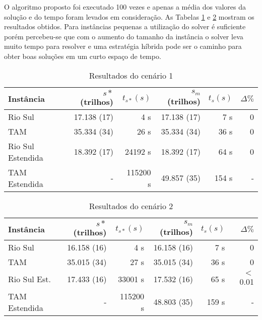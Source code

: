 O algoritmo proposto foi executado 100 vezes e apenas a média dos valores da
solução e do tempo foram levados em consideração. As Tabelas \ref{tab:cenario1}
e \ref{tab:cenario2} mostram os resultados obtidos. Para instâncias pequenas a
utilização do solver é suficiente porém percebeu-se que com o aumento do tamanho
da instância o solver leva muito tempo para resolver e uma estratégia híbrida
pode ser o caminho para obter boas soluções em um curto espaço de tempo.

\begin{table}[ht]
\caption{Resultados do cenário 1}\label{tab:cenario1}


\begin{tabular}{l r r r r r}
\hline

Instância 			& $s*$ (trilhos) & $t_{s*}(s)$ & $s_{m}$ (trilhos) & $t_{s}(s)$ &
$\Delta\%$
\\
\hline

Rio Sul 			& 17.138 (17) & 4 s		 	& 17.138 (17) 	& 7 s 		 & 0\\
TAM     			& 35.334 (34) & 26 s	 	& 35.334 (34)	& 36 s 		 & 0\\
Rio Sul Estendida 	& 18.392 (17) & 24192 s	 	& 18.392 (17)	& 64 s 		 & 0\\
TAM Estendida 		& - 		  & 115200 s 	& 49.857 (35)	& 154 s		 & -\\

\hline
\end{tabular}

\end{table}


\begin{table}[ht]
\caption{Resultados do cenário 2}\label{tab:cenario2}


\begin{tabular}{l r r r r r}
\hline

Instância 			& $s*$ (trilhos) & $t_{s*}(s)$ & $s_{m}$ (trilhos) & $t_{s}(s)$ &
$\Delta\%$
\\
\hline

Rio Sul 			& 16.158 (16) & 4 s		 	& 16.158 (16) 	& 7 s 		 & 0\\
TAM     			& 35.015 (34) & 27 s	 	& 35.015 (34)	& 36 s 		 & 0\\
Rio Sul Est. 	& 17.433 (16) & 33001 s	 	& 17.532 (16)	& 65 s 		 &$<$0.01\\ 
TAM Estendida 		& - 		  & 115200 s 	& 48.803 (35)	& 159 s		 & -\\

\hline
\end{tabular}

\end{table}


